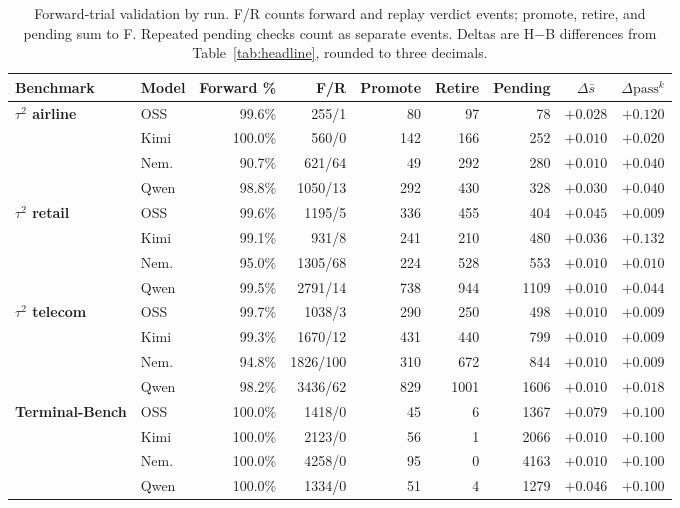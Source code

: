 \documentclass[11pt,letterpaper]{article}
\newcommand{\passk}{\mathrm{pass}^{k}}
\begin{document}
\begin{table}[H]
\centering\scriptsize
\setlength{\tabcolsep}{2.5pt}
\caption{Forward-trial validation by run. F/R counts forward and replay
verdict events; promote, retire, and pending sum to F. Repeated pending
checks count as separate events. Deltas are H$-$B differences from
Table~\ref{tab:headline}, rounded to three decimals.}
\label{tab:validation}
\begin{tabular*}{\linewidth}{@{\extracolsep{\fill}}llrrrrrcc@{}}
\toprule
Benchmark & Model & Forward \% & F/R & Promote & Retire & Pending &
$\Delta\bar s$ & $\Delta\passk$ \\
\midrule
\textbf{$\tau^2$ airline} & OSS & 99.6\% & 255/1 & 80 & 97 & 78 & $+0.028$ & $+0.120$ \\
 & Kimi & 100.0\% & 560/0 & 142 & 166 & 252 & $+0.010$ & $+0.020$ \\
 & Nem. & 90.7\% & 621/64 & 49 & 292 & 280 & $+0.010$ & $+0.040$ \\
 & Qwen & 98.8\% & 1050/13 & 292 & 430 & 328 & $+0.030$ & $+0.040$ \\
\midrule
\textbf{$\tau^2$ retail} & OSS & 99.6\% & 1195/5 & 336 & 455 & 404 & $+0.045$ & $+0.009$ \\
 & Kimi & 99.1\% & 931/8 & 241 & 210 & 480 & $+0.036$ & $+0.132$ \\
 & Nem. & 95.0\% & 1305/68 & 224 & 528 & 553 & $+0.010$ & $+0.010$ \\
 & Qwen & 99.5\% & 2791/14 & 738 & 944 & 1109 & $+0.010$ & $+0.044$ \\
\midrule
\textbf{$\tau^2$ telecom} & OSS & 99.7\% & 1038/3 & 290 & 250 & 498 & $+0.010$ & $+0.009$ \\
 & Kimi & 99.3\% & 1670/12 & 431 & 440 & 799 & $+0.010$ & $+0.009$ \\
 & Nem. & 94.8\% & 1826/100 & 310 & 672 & 844 & $+0.010$ & $+0.009$ \\
 & Qwen & 98.2\% & 3436/62 & 829 & 1001 & 1606 & $+0.010$ & $+0.018$ \\
\midrule
\textbf{Terminal-Bench} & OSS & 100.0\% & 1418/0 & 45 & 6 & 1367 & $+0.079$ & $+0.100$ \\
 & Kimi & 100.0\% & 2123/0 & 56 & 1 & 2066 & $+0.010$ & $+0.100$ \\
 & Nem. & 100.0\% & 4258/0 & 95 & 0 & 4163 & $+0.010$ & $+0.100$ \\
 & Qwen & 100.0\% & 1334/0 & 51 & 4 & 1279 & $+0.046$ & $+0.100$ \\
\bottomrule
\end{tabular*}
\end{table}
\end{document}
